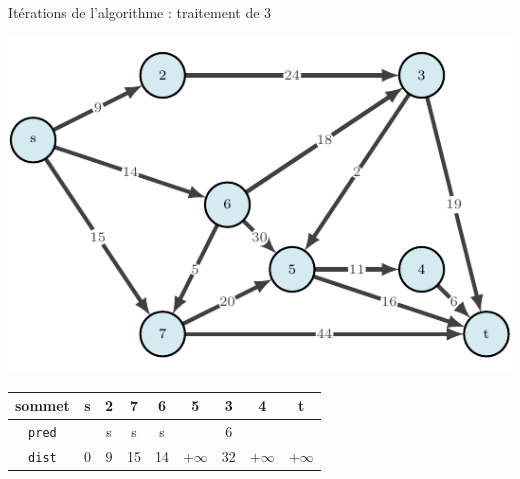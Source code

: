 \begin{frame}{Itérations de l'algorithme : traitement de $3$}
    \begin{center}
        \includegraphics[height=.6\textheight]{fig/ordinal-0.pdf}      
    \begin{tabular}{c|cccccccc}
        
        sommet & s       &2      &7      &6      &5      &3      &4      &t      \\
        \hline
        \texttt{pred} & &s      &s      &s      &       &6      &       &       \\
        \texttt{dist} & 0       &9      &15     &14     &$+\infty$    &32     &$+\infty$    &$+\infty$    \\
    \end{tabular}
\end{center}
\end{frame}


